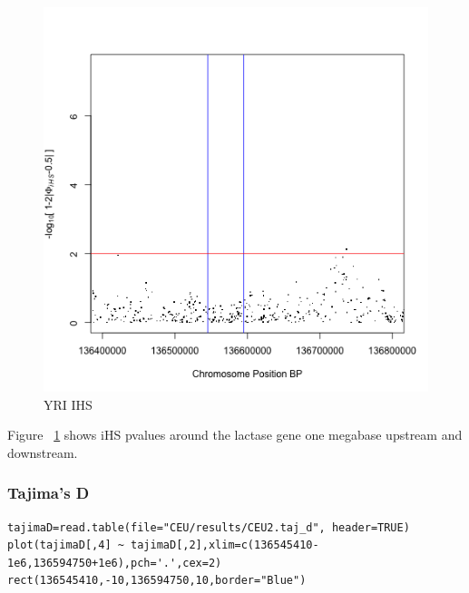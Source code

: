 \documentclass[a4paper,10pt]{article}
\begin{document}
\begin{figure}
\centering
\includegraphics{pictures/YRIihs.png}
\caption{YRI IHS}
\label{fig:yriihs}
\end{figure}

Figure ~\ref{fig:yriihs} shows iHS pvalues around the lactase gene one megabase upstream and downstream.
\subsubsection{Tajima's D}
\begin{verbatim}
tajimaD=read.table(file="CEU/results/CEU2.taj_d", header=TRUE)
plot(tajimaD[,4] ~ tajimaD[,2],xlim=c(136545410-1e6,136594750+1e6),pch='.',cex=2)
rect(136545410,-10,136594750,10,border="Blue") 
\end{verbatim}
\end{document}

